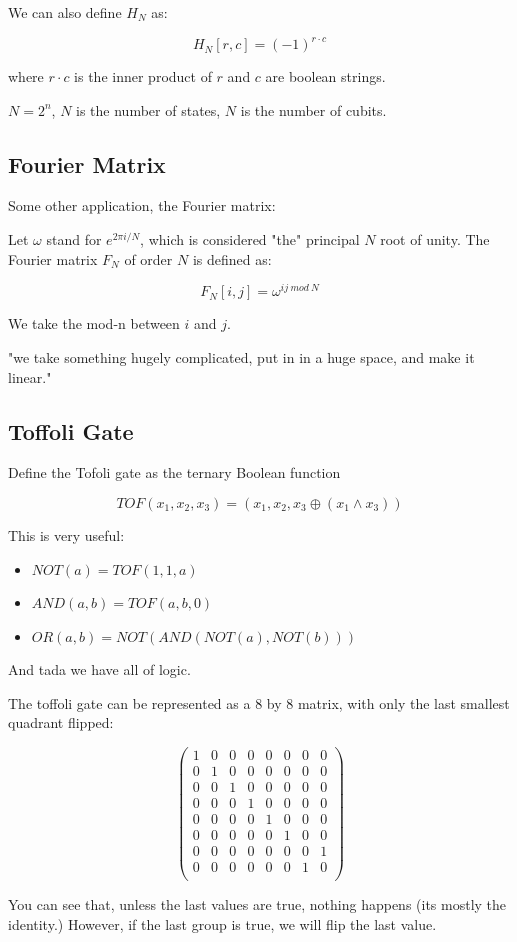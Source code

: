 \documentclass[letterpaper]{article}
\begin{document}
We can also define \(H_N\) as:

\begin{equation}
   H_N[r, c] = (-1)^{r \cdot c} 
\end{equation}

where \(r \cdot c\) is the inner product of \(r\) and \(c\) are boolean strings.

\(N = 2^n\), \(N\) is the number of states, \(N\) is the number of cubits.

\subsection{Fourier Matrix}
\label{sec:org5a131ce}
Some other application, the Fourier matrix:

Let \(\omega\) stand for \(e^{2\pi i / N}\), which is considered "the" principal \(N\) root of unity. The Fourier matrix \(F_N\) of order \(N\) is defined as:

\begin{equation}
   F_N [i,j] = \omega^{ij\ mod\ N} 
\end{equation}

We take the mod-n between \(i\) and \(j\). 

"we take something hugely complicated, put in in a huge space, and make it linear."

\subsection{Toffoli Gate}
\label{sec:orga4dc38a}
Define the Tofoli gate as the ternary Boolean function

\begin{equation}
   TOF(x_1, x_2, x_3) = (x_1, x_2, x_3 \oplus (x_1 \wedge x_3)) 
\end{equation}

This is very useful:

\begin{itemize}
\item \(NOT(a) = TOF(1,1,a)\)
\item \(AND(a,b) = TOF(a,b,0)\)
\item \(OR(a,b) = NOT(AND(NOT(a), NOT(b)))\)
\end{itemize}

And tada we have all of logic.

The toffoli gate can be represented as a \(8\) by \(8\) matrix, with only the last smallest quadrant flipped:

\begin{equation}
   \begin{pmatrix}
1 & 0 & 0 &0 &0&0&0&0 \\
0 & 1 & 0 &0 &0&0&0&0 \\
0 & 0 & 1 &0 &0&0&0&0 \\
0 & 0 & 0 &1 &0&0&0&0 \\
0 & 0 & 0 &0 &1&0&0&0 \\
0 & 0 & 0 &0 &0&1&0&0 \\
0 & 0 & 0 &0 &0&0&0&1 \\
0 & 0 & 0 &0 &0&0&1&0 \\
\end{pmatrix} 
\end{equation}

You can see that, unless the last values are true, nothing happens (its mostly the identity.) However, if the last group is true, we will flip the last value.
\end{document}
